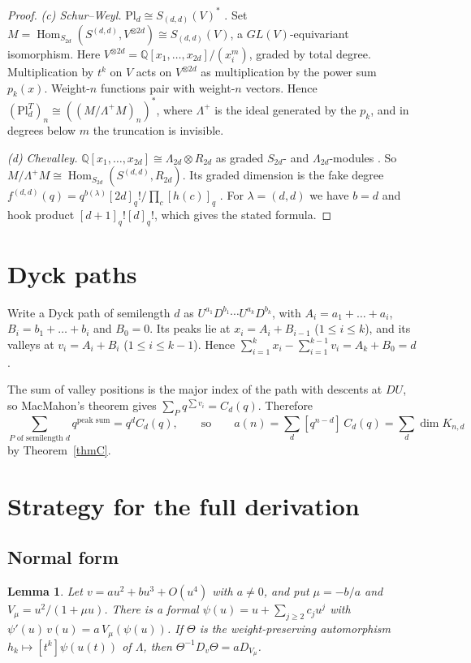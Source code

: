 \documentclass[11pt]{article}
\newtheorem{lemma}[theorem]{Lemma}
\theoremstyle{definition}
\theoremstyle{remark}
\newcommand{\Q}{\mathbb{Q}}
\newcommand{\La}{\Lambda}
\newcommand{\Pl}{\mathrm{Pl}}
\newcommand{\Hom}{\operatorname{Hom}}
\begin{document}
\begin{proof}
\emph{(c) Schur--Weyl.} $\Pl_d\cong S_{(d,d)}(V)^*$ \cite{Ful}. Set
$M=\Hom_{S_{2d}}(S^{(d,d)},V^{\otimes2d})\cong S_{(d,d)}(V)$, a $GL(V)$-equivariant isomorphism. Here
$V^{\otimes2d}=\Q[x_1,\dots,x_{2d}]/(x_i^m)$, graded by total degree. Multiplication by $t^k$ on $V$ acts on
$V^{\otimes2d}$ as multiplication by the power sum $p_k(x)$. Weight-$n$ functions pair with weight-$n$ vectors.
Hence $(\Pl_d^T)_n\cong((M/\La^+M)_n)^*$, where $\La^+$ is the ideal generated by the $p_k$, and in degrees
below $m$ the truncation is invisible.

\emph{(d) Chevalley.} $\Q[x_1,\dots,x_{2d}]\cong\La_{2d}\otimes R_{2d}$ as graded $S_{2d}$- and $\La_{2d}$-modules
\cite{Che}. So $M/\La^+M\cong\Hom_{S_{2d}}(S^{(d,d)},R_{2d})$. Its graded dimension is the fake degree
$f^{(d,d)}(q)=q^{b(\lambda)}[2d]_q!/\prod_{c}[h(c)]_q$ \cite{Sta79}. For $\lambda=(d,d)$ we have $b=d$ and hook
product $[d+1]_q![d]_q!$, which gives the stated formula.
\end{proof}

\section{Dyck paths}\label{sec:dyck}

Write a Dyck path of semilength $d$ as $U^{a_1}D^{b_1}\cdots U^{a_k}D^{b_k}$, with $A_i=a_1+\dots+a_i$,
$B_i=b_1+\dots+b_i$ and $B_0=0$. Its peaks lie at $x_i=A_i+B_{i-1}$ ($1\le i\le k$), and its valleys at
$v_i=A_i+B_i$ ($1\le i\le k-1$). Hence $\sum_{i=1}^kx_i-\sum_{i=1}^{k-1}v_i=A_k+B_0=d$.

The sum of valley positions is the major index of the path with descents at $DU$, so MacMahon's theorem
\cite{MacM} gives $\sum_{P}q^{\sum v_i}=C_d(q)$. Therefore
\[
  \sum_{P\text{ of semilength }d}q^{\text{peak sum}}=q^dC_d(q),\qquad\text{so}\qquad
  a(n)=\sum_d[q^{n-d}]\,C_d(q)=\sum_d\dim K_{n,d}
\]
by Theorem~\ref{thmC}.

\section{Strategy for the full derivation}\label{sec:lower}

\subsection{Normal form}

\begin{lemma}\label{normal}
Let $v=au^2+bu^3+O(u^4)$ with $a\ne0$, and put $\mu=-b/a$ and $V_\mu=u^2/(1+\mu u)$. There is a formal
$\psi(u)=u+\sum_{j\ge2}c_ju^j$ with $\psi'(u)\,v(u)=a\,V_\mu(\psi(u))$. If $\Theta$ is the weight-preserving
automorphism $h_k\mapsto[t^k]\psi(u(t))$ of $\La$, then $\Theta^{-1}D_v\Theta=aD_{V_\mu}$.
\end{lemma}
\end{document}

